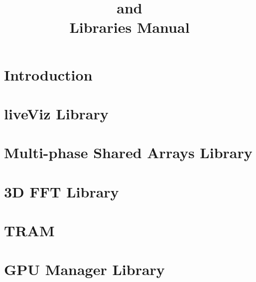 \documentclass[10pt]{report}
\title{\converse{} and \charmpp{}\\ Libraries Manual}
\begin{document}
\maketitle

\chapter{Introduction}

\chapter{liveViz Library}

\chapter{Multi-phase Shared Arrays Library}

\chapter{3D FFT Library}

\chapter{TRAM}

\chapter{GPU Manager Library}



\end{document}
